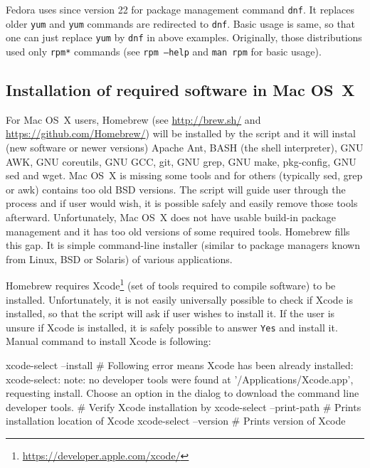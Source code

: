 \documentclass[a4paper, 11pt, twoside]{article}
\begin{document}
Fedora uses since version 22 for package management command \texttt{dnf}. It replaces older \texttt{yum} and \texttt{yum} commands are redirected to \texttt{dnf}. Basic usage is same, so that one can just replace \texttt{yum} by \texttt{dnf} in above examples. Originally, those distributions used only \texttt{rpm*} commands (see \texttt{rpm --help} and \texttt{man rpm} for basic usage).

\subsection{Installation of required software in Mac OS~X}
\label{required-mac}

For Mac OS~X users, Homebrew (see \href{http://brew.sh/}{http://brew.sh/} and \href{https://github.com/Homebrew/}{https://github.com/Homebrew/}) will be installed by the script and it will instal (new software or newer versions) Apache Ant, BASH (the shell interpreter), GNU AWK, GNU coreutils, GNU GCC, git, GNU grep, GNU make, pkg-config, GNU sed and wget. Mac OS~X is missing some tools and for others (typically sed, grep or awk) contains too old BSD versions. The script will guide user through the process and if user would wish, it is possible safely and easily remove those tools afterward. Unfortunately, Mac OS~X does not have usable build-in package management and it has too old versions of some required tools. Homebrew fills this gap. It is simple command-line installer (similar to package managers known from Linux, BSD or Solaris) of various applications.

Homebrew requires Xcode\footnote{\href{https://developer.apple.com/xcode/}{https://developer.apple.com/xcode/}} (set of tools required to compile software) to be installed. Unfortunately, it is not easily universally possible to check if Xcode is installed, so that the script will ask if user wishes to install it. If the user is unsure if Xcode is installed, it is safely possible to answer \texttt{Yes} and install it. Manual command to install Xcode is following:

\begin{bashcode}
  xcode-select --install
  # Following error means Xcode has been already installed:
  xcode-select: note: no developer tools were found at '/Applications/Xcode.app',
    requesting install. Choose an option in the dialog to download the command
    line developer tools.
  # Verify Xcode installation by
  xcode-select --print-path # Prints installation location of Xcode
  xcode-select --version # Prints version of Xcode
\end{bashcode}
\end{document}
